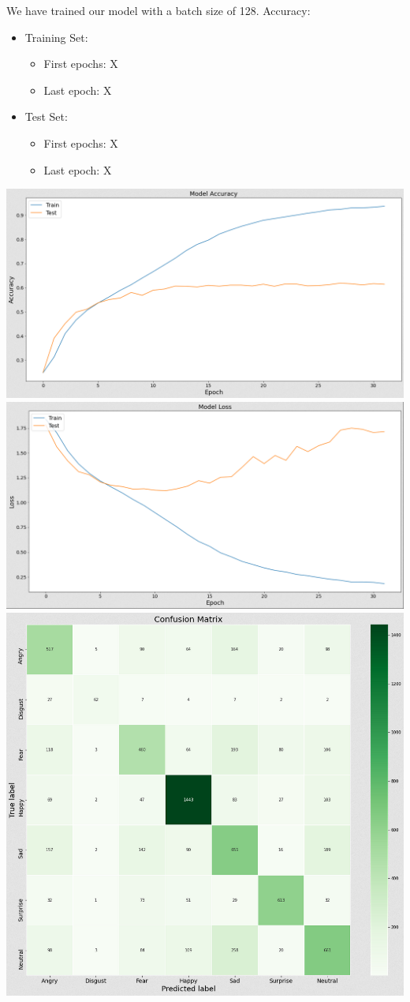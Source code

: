 We have trained our model with a batch size of 128.
Accuracy:
\begin{itemize}
      \item Training Set:
        \begin{itemize}
            \item First epochs: X
            \item Last epoch: X
        \end{itemize}
      \item Test Set:
        \begin{itemize}
            \item First epochs: X
            \item Last epoch: X
        \end{itemize}
\end{itemize}
\includegraphics[scale=0.5]{images/modelTwo/accTwo.png}
\includegraphics[scale=0.5]{images/modelTwo/lossTwo.png}
\includegraphics[scale=0.60]{images/modelTwo/matrixTwo.png}
